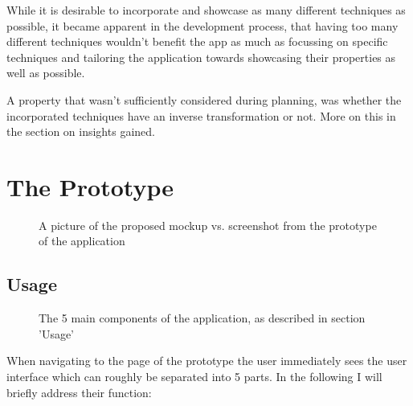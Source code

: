 \documentclass[11pt,a4paper]{article}
\begin{document}
    While it is desirable to incorporate and showcase as many different techniques as possible, it became apparent in the development process, that having too many different techniques wouldn't benefit the app as much as focussing on specific techniques and tailoring the application towards showcasing their properties as well as possible.

    A property that wasn't sufficiently considered during planning, was whether the incorporated techniques have an inverse transformation or not. More on this in the section on insights gained.
  
  \section{The Prototype}
    \begin{figure}
    \vspace{3px}
      \caption{A picture of the proposed mockup vs.  screenshot from the prototype of the application}
    \end{figure}

    \subsection{Usage}
        \label{usage}
        \begin{figure}
            \label{numbered sections}
            \caption{The 5 main components of the application, as described in section 'Usage'}
        \end{figure}
      When navigating to the page of the prototype the user immediately sees the user interface which can roughly be separated into 5 parts. In the following I will briefly address their function:
\end{document}
